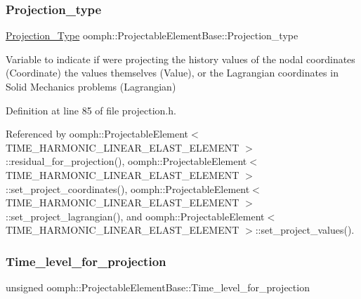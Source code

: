 \subsubsection{\texorpdfstring{Projection\+\_\+type}{Projection\_type}}
{\footnotesize\ttfamily \hyperlink{classoomph_1_1ProjectableElementBase_aa6b28955725b5626cc4cbf0465f12a9e}{Projection\+\_\+\+Type} oomph\+::\+Projectable\+Element\+Base\+::\+Projection\+\_\+type\hspace{0.3cm}{\ttfamily [protected]}}



Variable to indicate if we\textquotesingle{}re projecting the history values of the nodal coordinates (Coordinate) the values themselves (Value), or the Lagrangian coordinates in Solid Mechanics problems (Lagrangian) 



Definition at line 85 of file projection.\+h.



Referenced by oomph\+::\+Projectable\+Element$<$ T\+I\+M\+E\+\_\+\+H\+A\+R\+M\+O\+N\+I\+C\+\_\+\+L\+I\+N\+E\+A\+R\+\_\+\+E\+L\+A\+S\+T\+\_\+\+E\+L\+E\+M\+E\+N\+T $>$\+::residual\+\_\+for\+\_\+projection(), oomph\+::\+Projectable\+Element$<$ T\+I\+M\+E\+\_\+\+H\+A\+R\+M\+O\+N\+I\+C\+\_\+\+L\+I\+N\+E\+A\+R\+\_\+\+E\+L\+A\+S\+T\+\_\+\+E\+L\+E\+M\+E\+N\+T $>$\+::set\+\_\+project\+\_\+coordinates(), oomph\+::\+Projectable\+Element$<$ T\+I\+M\+E\+\_\+\+H\+A\+R\+M\+O\+N\+I\+C\+\_\+\+L\+I\+N\+E\+A\+R\+\_\+\+E\+L\+A\+S\+T\+\_\+\+E\+L\+E\+M\+E\+N\+T $>$\+::set\+\_\+project\+\_\+lagrangian(), and oomph\+::\+Projectable\+Element$<$ T\+I\+M\+E\+\_\+\+H\+A\+R\+M\+O\+N\+I\+C\+\_\+\+L\+I\+N\+E\+A\+R\+\_\+\+E\+L\+A\+S\+T\+\_\+\+E\+L\+E\+M\+E\+N\+T $>$\+::set\+\_\+project\+\_\+values().

\mbox{\label{classoomph_1_1ProjectableElementBase_a4698e178e500468c0af8c37bd47d0bd3}} 
\subsubsection{\texorpdfstring{Time\+\_\+level\+\_\+for\+\_\+projection}{Time\_level\_for\_projection}}
{\footnotesize\ttfamily unsigned oomph\+::\+Projectable\+Element\+Base\+::\+Time\+\_\+level\+\_\+for\+\_\+projection\hspace{0.3cm}{\ttfamily [protected]}}



